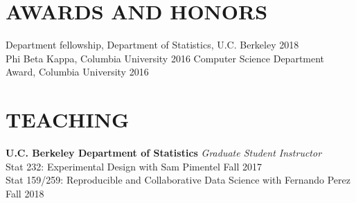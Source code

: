 \documentclass{res}
\begin{document}
\begin{resume}
\section{AWARDS AND HONORS}
\hspace{0.2em} Department fellowship, Department of Statistics, U.C. Berkeley \hfill 2018\\
\hspace{3em}{\footnotesize Two years of funding through RTG grant: Advancing Machine Learning - Causality and Interpretability}
\vskip -8pt
\hspace{0.2em} Phi Beta Kappa, Columbia University \hfill 2016
\vskip -8pt
\hspace{0.2em} Computer Science Department Award, Columbia University \hfill 2016\\
\hspace{3em}{\footnotesize Given to the top two graduating seniors each year}


\section{TEACHING}
\textbf{U.C. Berkeley Department of Statistics}
\textit{Graduate Student Instructor}\\
\hspace{0.2em} Stat 232: Experimental Design with Sam Pimentel \hfill Fall 2017\\
\hspace{0.2em} Stat 159/259: Reproducible and Collaborative Data Science with Fernando Perez \hfill Fall 2018



\end{resume}
\end{document}
